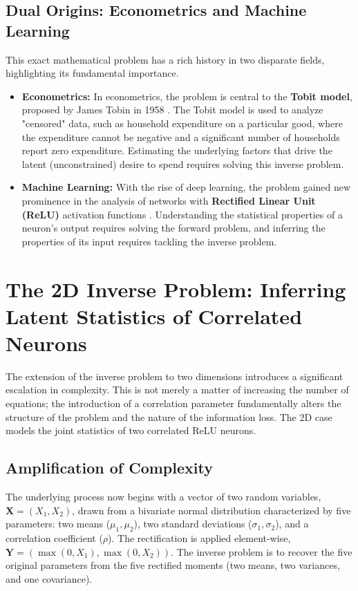 \subsection{Dual Origins: Econometrics and Machine Learning}
This exact mathematical problem has a rich history in two disparate fields, highlighting its fundamental importance.
\begin{itemize}
    \item \textbf{Econometrics:} In econometrics, the problem is central to the \textbf{Tobit model}, proposed by James Tobin in 1958 \cite{Tobin1958LimitedDependent}. The Tobit model is used to analyze "censored" data, such as household expenditure on a particular good, where the expenditure cannot be negative and a significant number of households report zero expenditure. Estimating the underlying factors that drive the latent (unconstrained) desire to spend requires solving this inverse problem.
    \item \textbf{Machine Learning:} With the rise of deep learning, the problem gained new prominence in the analysis of networks with \textbf{Rectified Linear Unit (ReLU)} activation functions \cite{Socci1998RectifiedGaussian}. Understanding the statistical properties of a neuron's output requires solving the forward problem, and inferring the properties of its input requires tackling the inverse problem.
\end{itemize}

\section{The 2D Inverse Problem: Inferring Latent Statistics of Correlated Neurons}
\label{sec:inverse_2d}

The extension of the inverse problem to two dimensions introduces a significant escalation in complexity. This is not merely a matter of increasing the number of equations; the introduction of a correlation parameter fundamentally alters the structure of the problem and the nature of the information loss. The 2D case models the joint statistics of two correlated ReLU neurons.

\subsection{Amplification of Complexity}
The underlying process now begins with a vector of two random variables, $\mathbf{X} = (X_1, X_2)$, drawn from a bivariate normal distribution characterized by five parameters: two means ($\mu_1, \mu_2$), two standard deviations ($\sigma_1, \sigma_2$), and a correlation coefficient ($\rho$). The rectification is applied element-wise, $\mathbf{Y} = (\max(0, X_1), \max(0, X_2))$. The inverse problem is to recover the five original parameters from the five rectified moments (two means, two variances, and one covariance).

